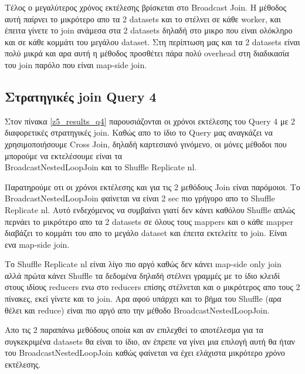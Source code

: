 \documentclass[12pt, a4paper]{article}
\begin{document}
Τέλος ο μεγαλύτερος χρόνος εκτέλεσης βρίσκεται στο Broadcast Join. Η μέθοδος αυτή παίρνει το μικρότερο
απο τα 2 datasets και το στέλνει σε κάθε worker, και έπειτα γίνετε το join ανάμεσα στα
2 datasets δηλαδή στο μικρο που είναι ολόκληρο και σε κάθε κομμάτι του μεγάλου dataset.
Στη περίπτωση μας και τα 2 datasets είναι πολύ μικρά και αρα αυτή η μέθοδος προσθέτει πάρα 
πολύ overhead στη διαδικασία του join παρόλο που είναι map-side join.


\subsection*{Στρατηγικές join Query 4}

Στον πίνακα \ref{z5_results_q4} παρουσιάζονται οι χρόνοι εκτέλεσης του Query 4 με 2 διαφορετικές
στρατηγικές join. Καθώς απο το ίδιο το Query μας αναγκάζει να χρησιμοποιήσουμε Cross Join, δηλαδή
καρτεσιανό γινόμενο, οι μόνες μέθοδοι που μπορούμε να εκτελέσουμε είναι τα \\BroadcastNestedLoopJoin 
και το Shuffle Replicate nl.

\begin{table}[h]
\centering
{}
\caption{Σύγκριση διαφορετικών στρατηγικών join για το Query 4.}
\label{z5_results_q4}
\end{table}

Παρατηρούμε οτι οι χρόνοι εκτέλεσης και για τις 2 μεθόδους Join είναι παρόμοιοι. Το BroadcastNestedLoopJoin
φαίνεται να είναι 2 sec πιο γρήγορο απο το Shuffle Replicate nl. Αυτό ενδεχόμενος να συμβαίνει
γιατί δεν κάνει καθόλου Shuffle απλώς περνάει το μικρότερο απο τα 2 datasets σε όλους
τους mappers και ο κάθε mapper διαβάζει το κομμάτι του απο το μεγάλο dataset και έπειτα
εκτελείτε το join. Είναι ενα map-side join. 

Το Shuffle Replicate nl είναι λίγο πιο αργό καθώς δεν κάνει map-side only join αλλά πρώτα
κάνει Shuffle τα δεδομένα δηλαδή στέλνει γραμμές με το ίδιο κλειδί στους ιδίους reducers
ενω στο reducers επίσης στέλνεται και ο μικρότερος απο τους 2 πίνακες, εκεί γίνετε και το
join. Αρα αφού υπάρχει και το βήμα του Shuffle (αρα θέλει και reduce) είναι πιο αργό απο
την μέθοδο BroadcastNestedLoopJoin.

Απο τις 2 παραπάνω μεθόδους οποία και αν επιλεχθεί το αποτέλεσμα για τα συγκεκριμένα datasets
θα είναι το ίδιο, αν έπρεπε να γίνει μια επιλογή αυτή θα ήταν του BroadcastNestedLoopJoin
καθώς φαίνεται να έχει ελάχιστα μικρότερο χρόνο εκτέλεσης.
\end{document}
